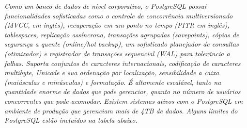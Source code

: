\documentclass[a4paper,10pt]{article}
\begin{document}
	{\it Como um banco de dados de nível corporativo, o PostgreSQL  possui funcionalidades sofisticadas como o controle de concorrência 
	multiversionado (MVCC, em inglês), recuperação em um ponto no tempo (PITR em inglês), tablespaces, replicação assíncrona, transações
	 agrupadas (savepoints), cópias de segurança a quente (online/hot backup), um sofisticado planejador de consultas (otimizador) e registrador 
	de transações sequencial (WAL) para tolerância a falhas.  Suporta conjuntos de caracteres internacionais, codificação de caracteres multibyte, 
	Unicode e sua ordenação por localização, sensibilidade a caixa (maiúsculas e minúsculas) e formatação.  É altamente escalável, tanto na quantidade
	 enorme de dados que pode gerenciar, quanto no número de usuários concorrentes que pode acomodar. Existem sistemas ativos com o PostgreSQL em
	 ambiente de produção que gerenciam mais de 4TB de dados.  Alguns limites do PostgreSQL estão incluídos na tabela abaixo.}\cite{postgresql}
	
\end{document}
